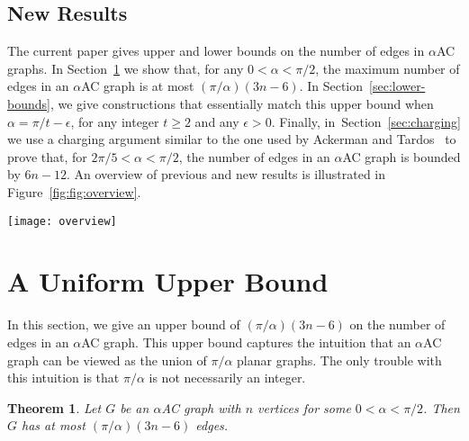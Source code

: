 \documentclass{patmorin}
\newcommand{\seclabel}[1]{\label{sec:#1}}
\newcommand{\secref}[1]{\mbox{Section~\ref{sec:#1}}}
\newcommand{\figlabel}[1]{\label{fig:#1}}
\newcommand{\figref}[1]{\mbox{Figure~\ref{fig:#1}}}
\newtheorem{thm}{Theorem}
\newcommand{\thmlabel}[1]{\label{thm:#1}}
\begin{document}
\subsection{New Results}

The current paper gives upper and lower bounds on the number of edges in
$\alpha$AC graphs.  In \secref{uniform} we show that, for any $0< \alpha
<\pi/2$, the maximum number of edges in an $\alpha$AC graph is at most
$(\pi/\alpha)(3n-6)$.  In \secref{lower-bounds}, we give constructions that
essentially match this upper bound when $\alpha = \pi/t-\epsilon$, for
any integer $t\ge 2$ and any $\epsilon > 0$.  Finally, in~\secref{charging} we use
a charging argument similar to the one used by
Ackerman and Tardos~\cite{at-mneqp-07} to prove that, for
$2\pi/5 < \alpha < \pi/2$, the number of edges in an $\alpha$AC graph is
bounded by $6n-12$.
An overview of previous and new results is illustrated in \figref{fig:overview}.
\begin{figure*}[tbh]
  \begin{center}
    \texttt{[image: overview]}
  \end{center}
  \caption{A plot of previous and new upper and lower bounds. Lower order terms are disregarded.}
  \figlabel{fig:overview}
\end{figure*}

\section{A Uniform Upper Bound}
\seclabel{uniform}

In this section, we give an upper bound of $(\pi/\alpha)(3n-6)$ on the
number of edges in an $\alpha$AC graph.
This upper bound captures the intuition that an $\alpha$AC graph can be viewed as the union of $\pi/\alpha$
planar graphs. The only trouble with this intuition is that $\pi/\alpha$
is not necessarily an integer.

\begin{thm}\thmlabel{uniform-upper-bound}
Let $G$ be an $\alpha$AC graph with $n$ vertices for some $0<\alpha<\pi/2$.
Then $G$ has at most $(\pi/\alpha)(3n-6)$ edges.
\end{thm}
\end{document}
